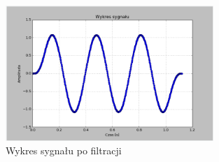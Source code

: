 \documentclass{article}
\begin{document}
{{            \begin{figure}[h!]
                \centering
                \includegraphics[width=0.7\textwidth]{img/fil6.png}
                \caption{Wykres sygnału po filtracji}
            \end{figure}
            \FloatBarrier
        }
        \newpage

}
\end{document}
